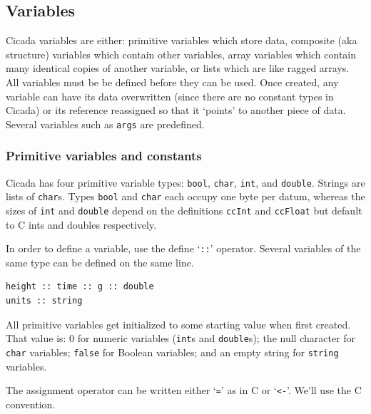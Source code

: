 \documentclass{article}
\newenvironment{code}{
       \begin{list}{}{
               \setlength{\leftmargin}{.4in}
               \setlength{\rightmargin}{0in}
               \setlength{\topsep}{.2in}
       }
       \small
       \item[] }
       { \end{list}   }
\begin{document}

\subsection{Variables}

Cicada variables are either: primitive variables which store data, composite (aka structure) variables which contain other variables, array variables which contain many identical copies of another variable, or lists which are like ragged arrays.  All variables must be be defined before they can be used.  Once created, any variable can have its data overwritten (since there are no constant types in Cicada) or its reference reassigned so that it `points' to another piece of data.  Several variables such as \verb#args# are predefined.


\subsubsection{Primitive variables and constants}

 Cicada has four primitive variable types:  \verb#bool#, \verb#char#, \verb#int#, and \verb#double#.  Strings are lists of \verb#char#s.  Types \verb#bool# and \verb#char# each occupy one byte per datum, whereas the sizes of \verb#int# and \verb#double# depend on the definitions \verb#ccInt# and \verb#ccFloat# but default to C ints and doubles respectively.

In order to define a variable, use the define `\texttt{::}' operator.  Several variables of the same type can be defined on the same line.

\begin{code} \begin{verbatim}
height :: time :: g :: double
units :: string
\end{verbatim} \end{code}

\noindent All primitive variables get initialized to some starting value when first created.  That value is:  0 for numeric variables (\verb#int#s and \verb#double#s); the null character for \verb#char# variables; \verb#false# for Boolean variables; and an empty string for \verb#string# variables.

The assignment operator can be written either `\verb#=#' as in C or `\verb#<-#'.  We'll use the C convention.
\end{document}
